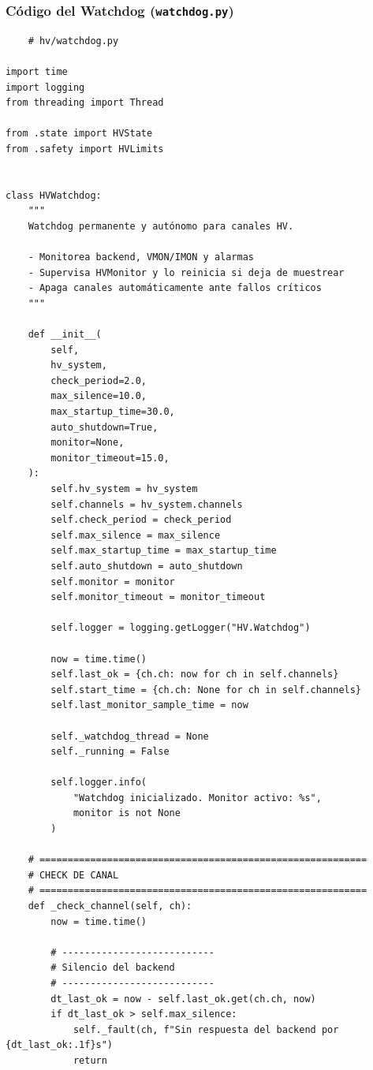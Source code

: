 \documentclass{article}
\begin{document}
\subsubsection{Código del Watchdog (\texttt{watchdog.py})} 
\begin{lstlisting}
    # hv/watchdog.py

import time
import logging
from threading import Thread

from .state import HVState
from .safety import HVLimits


class HVWatchdog:
    """
    Watchdog permanente y autónomo para canales HV.

    - Monitorea backend, VMON/IMON y alarmas
    - Supervisa HVMonitor y lo reinicia si deja de muestrear
    - Apaga canales automáticamente ante fallos críticos
    """

    def __init__(
        self,
        hv_system,
        check_period=2.0,
        max_silence=10.0,
        max_startup_time=30.0,
        auto_shutdown=True,
        monitor=None,
        monitor_timeout=15.0,
    ):
        self.hv_system = hv_system
        self.channels = hv_system.channels
        self.check_period = check_period
        self.max_silence = max_silence
        self.max_startup_time = max_startup_time
        self.auto_shutdown = auto_shutdown
        self.monitor = monitor
        self.monitor_timeout = monitor_timeout

        self.logger = logging.getLogger("HV.Watchdog")

        now = time.time()
        self.last_ok = {ch.ch: now for ch in self.channels}
        self.start_time = {ch.ch: None for ch in self.channels}
        self.last_monitor_sample_time = now

        self._watchdog_thread = None
        self._running = False

        self.logger.info(
            "Watchdog inicializado. Monitor activo: %s",
            monitor is not None
        )

    # ==========================================================
    # CHECK DE CANAL
    # ==========================================================
    def _check_channel(self, ch):
        now = time.time()

        # ---------------------------
        # Silencio del backend
        # ---------------------------
        dt_last_ok = now - self.last_ok.get(ch.ch, now)
        if dt_last_ok > self.max_silence:
            self._fault(ch, f"Sin respuesta del backend por {dt_last_ok:.1f}s")
            return


\end{lstlisting}
\end{document}
